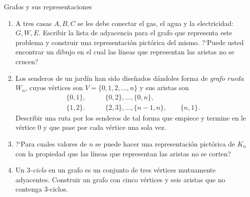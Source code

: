 \begin{section}{Grafos y sus representaciones}
\begin{enumerate}[1)]
\item A tres casas $A,B,C$ se les debe conectar el gas, el agua y la electricidad: $G,W,E$.
Escribir la lista de adyacencia para el grafo que representa este
problema y construir una representación pictórica del mismo.
?`Puede usted encontrar un dibujo en el cual las líneas que
representan las aristas no se crucen?
\item Los senderos de un jardín han sido diseñados dándoles forma de {\em grafo rueda}
$W_n$, cuyos vértices son $V=\{0,1,2,\ldots,n\}$ y sus aristas son
$$
\begin{aligned}
\{0,1\},\qquad &\{0,2\},\ldots,\{0,n\}, \\
\{1,2\}.\qquad &\{2,3\},\ldots,\{n-1,n\},\qquad \{n,1\}.
\end{aligned}
$$
Describir una ruta por los senderos de tal forma que empiece y
termine en le vértice $0$ y que pase por cada vértice una sola vez.
\item  ?`Para cuales valores de $n$ se puede hacer una representación pictórica
de $K_n$ con la propiedad que las líneas que representan las aristas no se corten?
\item Un {\it {$3$-ciclo}} en un grafo es un conjunto de tres vértices mutuamente adyacentes.
Construir un grafo con cinco vértices y seis aristas que no
contenga $3$-ciclos.
\end{enumerate}

\end{section}



